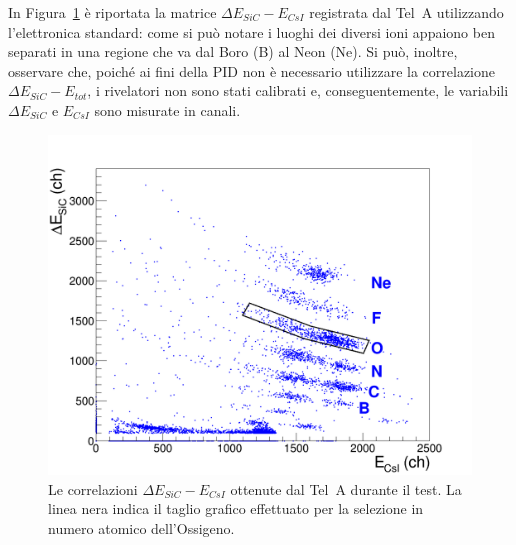 
In Figura~\ref{fig:sic_csi_standard} è riportata la matrice $\Delta E_{SiC} - E_{CsI}$ registrata dal Tel~A utilizzando l'elettronica standard: come si può notare i luoghi dei diversi ioni appaiono ben separati in una regione che va dal Boro (B) al Neon (Ne).
Si può, inoltre, osservare che, poiché ai fini della PID non è necessario utilizzare la correlazione $\Delta E_{SiC} - E_{tot}$, i rivelatori non sono stati calibrati e, conseguentemente, le variabili $\Delta E_{SiC}$ e $E_{CsI}$ sono misurate in canali.


\begin{figure} [!p]
	\centering
	\includegraphics[width=\textwidth, keepaspectratio]{Grafici_Tesi/Test/matrice_sic_csi_taglio3.png}
	\caption{Le correlazioni $\Delta E_{SiC} - E_{CsI}$ ottenute dal Tel~A durante il test. La linea nera indica il taglio grafico effettuato per la selezione in numero atomico dell'Ossigeno.} \label{fig:sic_csi_standard}
\end{figure}


